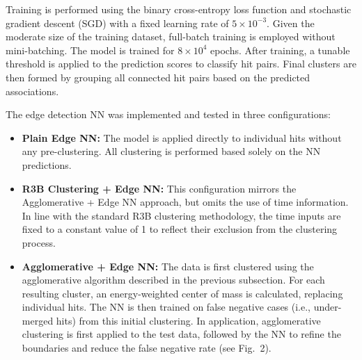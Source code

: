 \documentclass[final,5p,times,twocolumn]{elsarticle}
\begin{document}
Training is performed using the binary cross-entropy loss function \cite{mannor2005cross,de2005tutorial} and stochastic gradient descent (SGD) \cite{newton2018recent} with a fixed learning rate of $5 \times 10^{-3}$. Given the moderate size of the training dataset, full-batch training is employed without mini-batching. The model is trained for $8 \times 10^4$ epochs. After training, a tunable threshold is applied to the prediction scores to classify hit pairs. Final clusters are then formed by grouping all connected hit pairs based on the predicted associations.

The edge detection NN was implemented and tested in three configurations:

\begin{itemize}
    \item \textbf{Plain Edge NN:} The model is applied directly to individual hits without any pre-clustering. All clustering is performed based solely on the NN predictions.
    \item \textbf{R3B Clustering + Edge NN:} This configuration mirrors the Agglomerative + Edge NN approach, but omits the use of time information. In line with the standard R3B clustering methodology, the time inputs are fixed to a constant value of 1 to reflect their exclusion from the clustering process.
    \item \textbf{Agglomerative + Edge NN:} The data is first clustered using the agglomerative algorithm described in the previous subsection. For each resulting cluster, an energy-weighted center of mass is calculated, replacing individual hits. The NN is then trained on false negative cases (i.e., under-merged hits) from this initial clustering. In application, agglomerative clustering is first applied to the test data, followed by the NN to refine the boundaries and reduce the false negative rate (see Fig. \,2).
\end{itemize}
\end{document}

